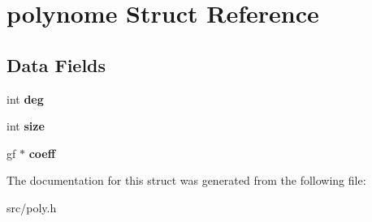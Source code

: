 \hypertarget{structpolynome}{}\section{polynome Struct Reference}
\label{structpolynome}
\subsection*{Data Fields}
\begin{DoxyCompactItemize}
\item 
\mbox{\label{structpolynome_a5feaa681dce2b731eabc1681f9a3e097}} 
int {\bfseries deg}
\item 
\mbox{\label{structpolynome_a4d9c64324a05ff23bff85eaf192162d1}} 
int {\bfseries size}
\item 
\mbox{\label{structpolynome_a3bf33057f1e26dff82f49ece722e2a75}} 
gf $\ast$ {\bfseries coeff}
\end{DoxyCompactItemize}


The documentation for this struct was generated from the following file\+:\begin{DoxyCompactItemize}
\item 
src/poly.\+h\end{DoxyCompactItemize}
